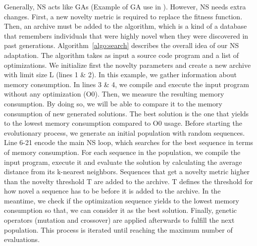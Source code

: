 Generally, NS acts like GAs (Example of GA use in  \cite{cooper2002adaptive}). However, NS needs extra changes. First, a new novelty metric is required to replace the fitness function. Then, an archive must be added to the algorithm, which is a kind of a database that remembers individuals that were highly novel when they were discovered in past generations. 
Algorithm~\ref{algo:search} describes the overall idea of our NS adaptation. The algorithm takes as input a source code program and a list of optimizations. We initialize first the novelty parameters and create a new archive with limit size L (lines 1 \& 2). In this example, we gather information about memory consumption. In lines 3 \& 4, we compile and execute the input program without any optimization (O0). Then, we measure the resulting memory consumption. By doing so, we will be able to compare it to the memory consumption of new generated solutions. The best solution is the one that yields to the lowest memory consumption compared to O0 usage.
Before starting the evolutionary process, we generate an initial population with random sequences. Line 6-21 encode the main NS loop, which searches for the best sequence in terms of memory consumption. For each sequence in the population, we compile the input program, execute it and evaluate the solution by calculating the average distance from its k-nearest neighbors. Sequences that get a novelty metric higher than the novelty threshold T are added to the archive. T defines the threshold for how novel a sequence has to be before it is added to the archive. In the meantime, we check if the optimization sequence yields to the lowest memory consumption so that, we can consider it as the best solution. Finally, genetic operators
(mutation and crossover) are applied afterwards to fulfill the next population. This process is iterated until reaching the maximum number of evaluations.


